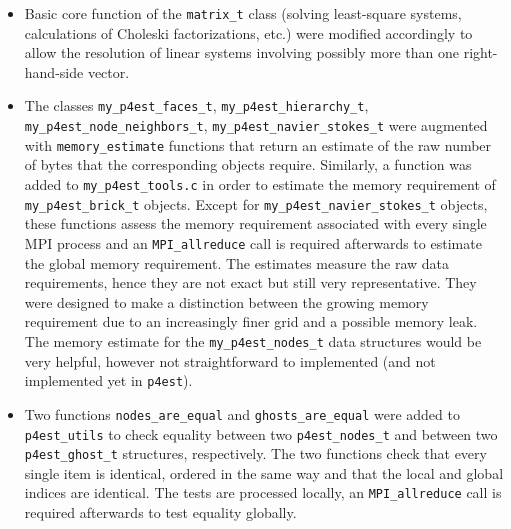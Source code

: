 \documentclass[11pt, a4paper]{article}
\theoremstyle{remark}
\begin{document}
\begin{itemize}
 \item Basic core function of the \verb|matrix_t| class (solving least-square systems, calculations of Choleski factorizations, etc.) were modified accordingly to allow the resolution of linear systems involving possibly more than one right-hand-side vector.
 \item The classes \verb|my_p4est_faces_t|, \verb|my_p4est_hierarchy_t|, \verb|my_p4est_node_neighbors_t|, \break \verb|my_p4est_navier_stokes_t| were augmented with \verb|memory_estimate| functions that return an estimate of the raw number of bytes that the corresponding objects require. Similarly, a function was added to \verb|my_p4est_tools.c| in order to estimate the memory requirement of \verb|my_p4est_brick_t| objects. Except for \verb|my_p4est_navier_stokes_t| objects, these functions assess the memory requirement associated with every single MPI process and an \verb|MPI_allreduce| call is required afterwards to estimate the global memory requirement. The estimates measure the raw data requirements, hence they are not exact but still very representative. They were designed to make a distinction between the growing memory requirement due to an increasingly finer grid and a possible memory leak. The memory estimate for the \verb|my_p4est_nodes_t| data structures would be very helpful, however not straightforward to implemented (and not implemented yet in \verb|p4est|).
 \item Two functions \verb|nodes_are_equal| and \verb|ghosts_are_equal| were added to \verb|p4est_utils| to check equality between two \verb|p4est_nodes_t| and between two \verb|p4est_ghost_t| structures, respectively. The two functions check that every single item is identical, ordered in the same way and that the local and global indices are identical. The tests are processed locally, an \verb|MPI_allreduce| call is required afterwards to test equality globally.

\end{itemize}
\end{document}
